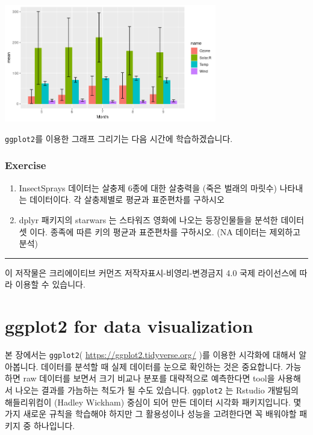 \documentclass[
]{book}
\begin{document}
\includegraphics[width=3.64583in,height=\textheight]{images/08/Rplot02.png}

\texttt{ggplot2}를 이용한 그래프 그리기는 다음 시간에 학습하겠습니다.

\hypertarget{ex8.3.1}{%
\subsection{Exercise}\label{ex8.3.1}}

\begin{enumerate}
\def\labelenumi{\arabic{enumi}.}
\item
  InsectSprays 데이터는 살충제 6종에 대한 살충력을 (죽은 벌래의 마릿수) 나타내는 데이터이다. 각 살충제별로 평균과 표준편차를 구하시오
\item
  dplyr 패키지의 starwars 는 스타워즈 영화에 나오는 등장인물들을 분석한 데이터셋 이다. 종족에 따른 키의 평균과 표준편차를 구하시오. (NA 데이터는 제외하고 분석)
\end{enumerate}

\begin{center}\rule{0.5\linewidth}{0.5pt}\end{center}

이 저작물은 크리에이티브 커먼즈 저작자표시-비영리-변경금지 4.0 국제 라이선스에 따라 이용할 수 있습니다.

\hypertarget{ggplot2-for-data-visualization}{%
\chapter{ggplot2 for data visualization}\label{ggplot2-for-data-visualization}}

본 장에서는 \texttt{ggplot2}( \url{https://ggplot2.tidyverse.org/} )를 이용한 시각화에 대해서 알아봅니다. 데이터를 분석할 때 실제 데이터를 눈으로 확인하는 것은 중요합니다. 가능하면 raw 데이터를 보면서 크기 비교나 분포를 대략적으로 예측한다면 tool을 사용해서 나오는 결과를 가늠하는 척도가 될 수도 있습니다. \texttt{ggplot2} 는 Rstudio 개발팀의 해들리위컴이 (Hadley Wickham) 중심이 되어 만든 데이터 시각화 패키지입니다. 몇 가지 새로운 규칙을 학습해야 하지만 그 활용성이나 성능을 고려한다면 꼭 배워야할 패키지 중 하나입니다.
\end{document}
